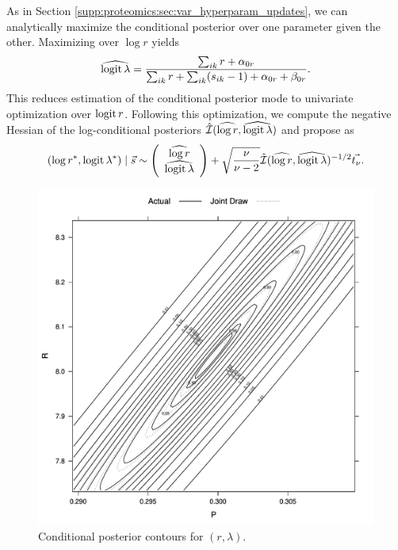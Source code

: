 As in Section \ref{supp:proteomics:sec:var_hyperparam_updates}, we can analytically maximize  the conditional posterior over one parameter given the other.
Maximizing over $\log r$ yields
%
\begin{equation*}
\widehat{\operatorname{logit} \lambda} = \frac{\sum_{ik}r + \alpha_{0r}}{\sum_{ik}r+\sum_{ik}(s_{ik}-1) + \alpha_{0r} + \beta_{0r}} .
\end{equation*}
%
This reduces estimation of the conditional posterior mode to univariate optimization over $\operatorname{logit} r$.
Following this optimization, we compute the negative Hessian of the log-conditional posteriors $\hat{\mathcal{I}}(\widehat{\log r}, \widehat{\operatorname{logit} \lambda})$ and propose as
\begin{equation*}
(\log r^*, \operatorname{logit} \lambda^*) \mid \vec s \sim \left(\begin{array}{c}
\widehat{\log r} \\
\widehat{\operatorname{logit} \lambda}
\end{array}\right) +
\sqrt{\frac{\nu}{\nu - 2}} \hat{\mathcal{I}}(\widehat{\log r}, \widehat{\operatorname{logit} \lambda})^{-1/2} \vec{t_{\nu}} .
\end{equation*}


\begin{figure}
\centering
\includegraphics[width=1\textwidth]{figures/proteomics/Neg_Bin_Parameter_Draw}
\caption{Conditional posterior contours for $(r, \lambda)$.\label{supp:proteomics:fig:Negative-binomial-parameters}}
\end{figure}


